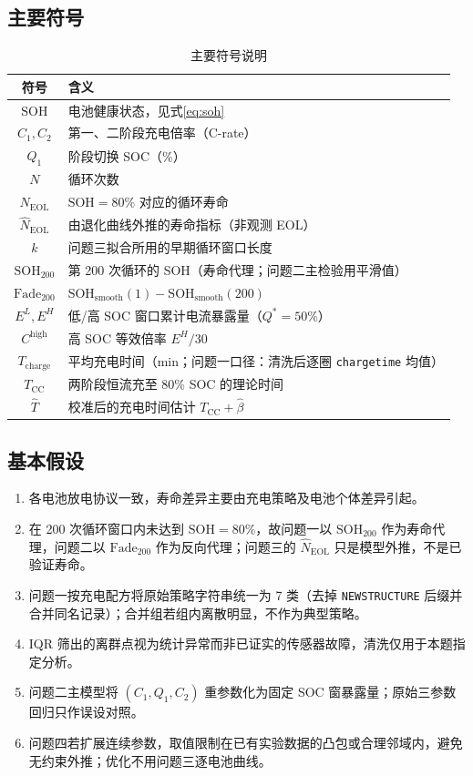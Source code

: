\documentclass[a4paper,12pt,UTF8,zihao=-4]{ctexart}
\begin{document}
\subsection{主要符号}
\begin{table}[htbp]
\centering
\caption{主要符号说明}
\label{tab:notation}
\begin{tabular}{cl}
\toprule
符号 & 含义 \\
\midrule
\(\mathrm{SOH}\) & 电池健康状态，见式\eqref{eq:soh} \\
\(C_1,C_2\) & 第一、二阶段充电倍率（C-rate） \\
\(Q_1\) & 阶段切换 SOC（\%） \\
\(N\) & 循环次数 \\
\(N_{\mathrm{EOL}}\) & \(\mathrm{SOH}=80\%\) 对应的循环寿命 \\
\(\hat N_{\mathrm{EOL}}\) & 由退化曲线外推的寿命指标（非观测 EOL） \\
\(k\) & 问题三拟合所用的早期循环窗口长度 \\
\(\mathrm{SOH}_{200}\) & 第 200 次循环的 SOH（寿命代理；问题二主检验用平滑值） \\
\(\mathrm{Fade}_{200}\) & \(\mathrm{SOH}_{\mathrm{smooth}}(1)-\mathrm{SOH}_{\mathrm{smooth}}(200)\) \\
\(E^{L},E^{H}\) & 低/高 SOC 窗口累计电流暴露量（\(Q^\ast=50\%\)） \\
\(C^{\mathrm{high}}\) & 高 SOC 等效倍率 \(E^{H}/30\) \\
\(T_{\mathrm{charge}}\) & 平均充电时间（min；问题一口径：清洗后逐圈 \texttt{chargetime} 均值） \\
\(T_{\mathrm{CC}}\) & 两阶段恒流充至 \(80\%\) SOC 的理论时间 \\
\(\widehat T\) & 校准后的充电时间估计 \(T_{\mathrm{CC}}+\hat\beta\) \\
\bottomrule
\end{tabular}
\end{table}

\subsection{基本假设}
\begin{enumerate}
  \item 各电池放电协议一致，寿命差异主要由充电策略及电池个体差异引起。
  \item 在 200 次循环窗口内未达到 \(\mathrm{SOH}=80\%\)，故问题一以 \(\mathrm{SOH}_{200}\) 作为寿命代理，问题二以 \(\mathrm{Fade}_{200}\) 作为反向代理；问题三的 \(\hat N_{\mathrm{EOL}}\) 只是模型外推，不是已验证寿命。
  \item 问题一按充电配方将原始策略字符串统一为 7 类（去掉 \texttt{NEWSTRUCTURE} 后缀并合并同名记录）；合并组若组内离散明显，不作为典型策略。
  \item IQR 筛出的离群点视为统计异常而非已证实的传感器故障，清洗仅用于本题指定分析。
  \item 问题二主模型将 \((C_1,Q_1,C_2)\) 重参数化为固定 SOC 窗暴露量；原始三参数回归只作误设对照。
  \item 问题四若扩展连续参数，取值限制在已有实验数据的凸包或合理邻域内，避免无约束外推；优化不用问题三逐电池曲线。
\end{enumerate}
\end{document}
